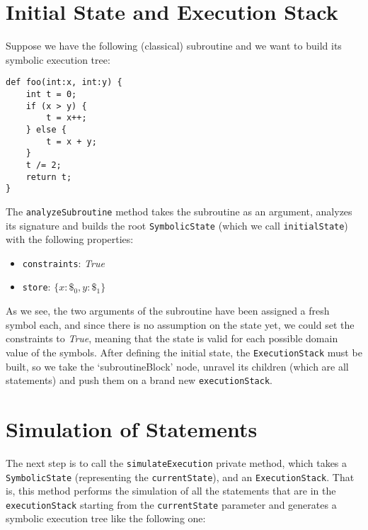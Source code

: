 \documentclass[12pt,a4paper]{report}
\theoremstyle{definition}
\theoremstyle{definition}
\theoremstyle{definition}
\begin{document}
\section{Initial State and Execution Stack}
Suppose we have the following (classical) subroutine and we want to build its symbolic execution tree:
\begin{lstlisting}
def foo(int:x, int:y) {
    int t = 0;
    if (x > y) {
        t = x++;
    } else {
        t = x + y;
    }
    t /= 2;
    return t;
}
\end{lstlisting}
The \texttt{analyzeSubroutine} method takes the subroutine as an argument, analyzes its signature and builds the root \texttt{SymbolicState} (which we call \texttt{initialState}) with the following properties:
\begin{itemize}
    \itemsep 0em
    \item \texttt{constraints}: \textit{True}
    \item \texttt{store}: $\{x: \$_0, y: \$_1\}$
\end{itemize}
As we see, the two arguments of the subroutine have been assigned a fresh symbol each, and since there is no assumption on the state yet, we could set the constraints to \textit{True}, meaning that the state is valid for each possible domain value of the symbols.
After defining the initial state, the \texttt{ExecutionStack} must be built, so we take the `subroutineBlock' node, unravel its children (which are all statements) and push them on a brand new \texttt{executionStack}.

\section{Simulation of Statements}
The next step is to call the \texttt{simulateExecution} private method, which takes a \texttt{SymbolicState} (representing the \texttt{currentState}), and an \texttt{ExecutionStack}. That is, this method performs the simulation of all the statements that are in the \texttt{executionStack} starting from the \texttt{currentState} parameter and generates a symbolic execution tree like the following one:
\end{document}
